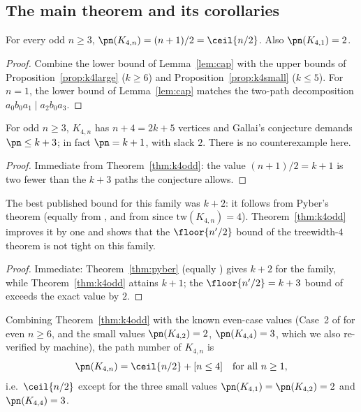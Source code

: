 \subsection{The main theorem and its corollaries}

\begin{theorem}\label{thm:k4odd}
For every odd $n\ge3$, $\pn(K_{4,n})=(n+1)/2=\ceil{n/2}$. Also $\pn(K_{4,1})=2$.
\end{theorem}

\begin{proof}
Combine the lower bound of Lemma~\ref{lem:cap} with the upper bounds of
Proposition~\ref{prop:k4large} ($k\ge6$) and Proposition~\ref{prop:k4small} ($k\le5$).
For $n=1$, the lower bound of Lemma~\ref{lem:cap} matches the two-path decomposition
$a_0b_0a_1 \mid a_2b_0a_3$.
\end{proof}

\begin{corollary}\label{cor:k4gallai}
For odd $n\ge3$, $K_{4,n}$ has $n+4=2k+5$ vertices and Gallai's conjecture demands
$\pn\le k+3$; in fact $\pn=k+1$, with slack $2$. There is no counterexample here.
\end{corollary}

\begin{proof}
Immediate from Theorem~\ref{thm:k4odd}: the value $(n+1)/2=k+1$ is two fewer than the
$k+3$ paths the conjecture allows.
\end{proof}

\begin{corollary}\label{cor:k4compare}
The best published bound for this family was $k+2$: it follows from Pyber's theorem
\cite{Pyb96} (equally from \cite{Fan05}, and from \cite{LY24} since $\mathrm{tw}(K_{4,n})=4$).
Theorem~\ref{thm:k4odd} improves it by one and shows that the $\floor{n'/2}$ bound of the
treewidth-$4$ theorem \cite{LY24} is not tight on this family.
\end{corollary}

\begin{proof}
Immediate: Theorem~\ref{thm:pyber} (equally \cite{Fan05,LY24}) gives $k+2$ for the family,
while Theorem~\ref{thm:k4odd} attains $k+1$; the $\floor{n'/2}=k+3$ bound of \cite{LY24}
exceeds the exact value by $2$.
\end{proof}

\begin{remark}\label{rem:k4all}
Combining Theorem~\ref{thm:k4odd} with the known even-case values (Case~2 of \cite{CE18} for
even $n\ge6$, and the small values $\pn(K_{4,2})=2$, $\pn(K_{4,4})=3$, which we also re-verified
by machine), the path number of $K_{4,n}$ is
\[
\pn(K_{4,n})=\ceil{n/2}+[n\le 4]\quad\text{for all } n\ge1,
\]
i.e.\ $\ceil{n/2}$ except for the three small values $\pn(K_{4,1})=\pn(K_{4,2})=2$ and
$\pn(K_{4,4})=3$.
\end{remark}

